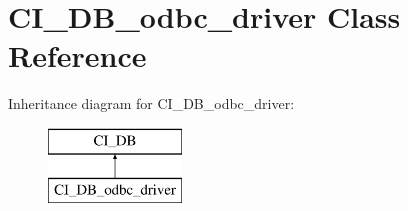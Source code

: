 \hypertarget{class_c_i___d_b__odbc__driver}{\section{C\-I\-\_\-\-D\-B\-\_\-odbc\-\_\-driver Class Reference}
\label{class_c_i___d_b__odbc__driver}
}
Inheritance diagram for C\-I\-\_\-\-D\-B\-\_\-odbc\-\_\-driver\-:\begin{figure}[H]
\begin{center}
\leavevmode
\includegraphics[height=2.000000cm]{class_c_i___d_b__odbc__driver}
\end{center}
\end{figure}
